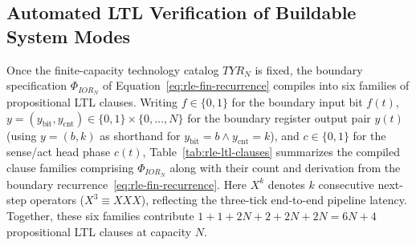\subsection{Automated LTL Verification of Buildable System Modes}
\label{sec:case-solver}

Once the finite-capacity technology catalog $TYR_N$ is fixed, the boundary specification $\Phi_{IOR_N}$ of Equation~\eqref{eq:rle-fin-recurrence} compiles into six families of propositional LTL clauses. Writing $f\in\{0,1\}$ for the boundary input bit $f(t)$, $y=(y_{\mathrm{bit}},y_{\mathrm{cnt}})\in\{0,1\}\times\{0,\dots,N\}$ for the boundary register output pair $y(t)$ (using $y=(b,k)$ as shorthand for $y_{\mathrm{bit}}=b \wedge y_{\mathrm{cnt}}=k$), and $c\in\{0,1\}$ for the sense/act head phase $c(t)$, Table~\ref{tab:rle-ltl-clauses} summarizes the compiled clause families comprising $\Phi_{IOR_N}$ along with their count and derivation from the boundary recurrence~\eqref{eq:rle-fin-recurrence}. Here $X^k$ denotes $k$ consecutive next-step operators ($X^3 \equiv XXX$), reflecting the three-tick end-to-end pipeline latency. Together, these six families contribute $1+1+2N+2+2N+2N = 6N+4$ propositional LTL clauses at capacity $N$.

